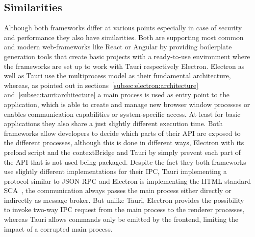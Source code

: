 \subsection{Similarities}\label{subsec:similarities}
Although both frameworks differ at various points especially in case of security and performance they also have similarities.
Both are supporting most common and modern web-frameworks like React or Angular by providing boilerplate generation tools that create basic projects with a ready-to-use environment where the frameworks are set up to work with Tauri respectively Electron.
Electron as well as Tauri use the multiprocess model as their fundamental architecture, whereas, as pointed out in sections~\ref{subsec:electron:architecture} and~\ref{subsec:tauri:architecture} a main process is used as entry point
to the application, which is able to create and manage new browser window processes or enables communication capabilities or system-specific access.
At least for basic applications they also share a just slightly different execution time.
Both frameworks allow developers to decide which parts of their \ac{API} are exposed to the different processes, although this is done in different ways, Electron with its preload script and the contextBridge and Tauri by simply prevent each part of the API that is not
used being packaged.
Despite the fact they both frameworks use slightly different implementations for their \ac{IPC}, Tauri implementing a protocol similar to \ac{JSON-RPC} and Electron is implementing the \ac{HTML} standard \ac{SCA}~\cite{ElectronDoc},
the communication always passes the main process either directly or indirectly as message broker.
But unlike Tauri, Electron provides the possibility to invoke two-way \ac{IPC} request from the main process to the renderer processes, whereas Tauri allows commands only be emitted by the frontend, limiting the impact
of a corrupted main process.


